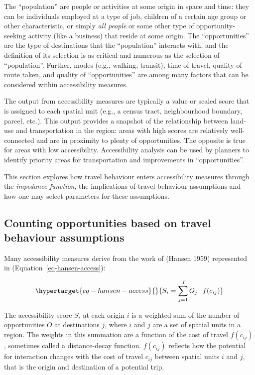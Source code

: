 \documentclass[12pt, oneside]{report}
\begin{document}
The ``population'' are people or activities at some origin in space and
time: they can be individuals employed at a type of job, children of a
certain age group or other characteristic, or simply \emph{all people}
or some other type of opportunity-seeking activity (like a business)
that reside at some origin. The ``opportunities'' are the type of
destinations that the ``population'' interacts with, and the definition
of its selection is as critical and numerous as the selection of
``population''. Further, modes (e.g., walking, transit), time of travel,
quality of route taken, and quality of ``opportunities'' are among many
factors that can be considered within accessibility measures.

The output from accessibility measures are typically a value or scaled
score that is assigned to each spatial unit (e.g., a census tract,
neighbourhood boundary, parcel, etc.). This output provides a snapshot
of the relationship between land-use and transportation in the region:
areas with high scores are relatively well-connected and are in
proximity to plenty of opportunities. The opposite is true for areas
with low accessibility. Accessibility analysis can be used by planners
to identify priority areas for transportation and improvements in
``opportunities''.

This section explores how travel behaviour enters accessibility measures
through the \emph{impedance function}, the implications of travel
behaviour assumptions and how one may select parameters for these
assumptions.

\hypertarget{counting-opportunities-based-on-travel-behaviour-assumptions}{%
\subsection{Counting opportunities based on travel behaviour
assumptions}\label{counting-opportunities-based-on-travel-behaviour-assumptions}}

Many accessibility measures derive from the work of (Hansen 1959)
represented in (Equation~\ref{eq-hansen-access}):

\begin{equation}\protect\hypertarget{eq-hansen-access}{}{
S_i = \sum_{j=1}^JO_j \cdot f(c_{ij})
}\label{eq-hansen-access}\end{equation}

The accessibility score \(S_i\) at each origin \(i\) is a weighted sum
of the number of opportunities \(O\) at destinations \(j\), where \(i\)
and \(j\) are a set of spatial units in a region. The weights in this
summation are a function of the cost of travel \(f(c_{ij})\), sometimes
called a distance-decay function. \(f(c_{ij})\) reflects how the
potential for interaction changes with the cost of travel \(c_{ij}\)
between spatial units \(i\) and \(j\), that is the origin and
destination of a potential trip.
\end{document}
